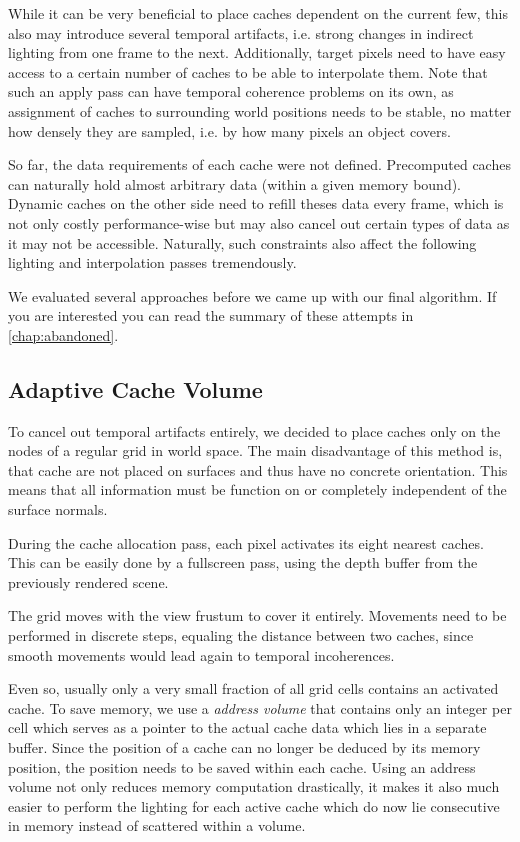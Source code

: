 \documentclass[thesis.tex]{subfiles}
\begin{document}
While it can be very beneficial to place caches dependent on the current few, this also may introduce several temporal artifacts, i.e. strong changes in indirect lighting from one frame to the next.
Additionally, target pixels need to have easy access to a certain number of caches to be able to interpolate them.
Note that such an apply pass can have temporal coherence problems on its own, as assignment of caches to surrounding world positions needs to be stable, no matter how densely they are sampled, i.e. by how many pixels an object covers.

So far, the data requirements of each cache were not defined.
Precomputed caches can naturally hold almost arbitrary data (within a given memory bound).
Dynamic caches on the other side need to refill theses data every frame, which is not only costly performance-wise but may also cancel out certain types of data as it may not be accessible. 
Naturally, such constraints also affect the following lighting and interpolation passes tremendously.

We evaluated several approaches before we came up with our final algorithm.
If you are interested you can read the summary of these attempts in \autoref{chap:abandoned}.

\subsection{Adaptive Cache Volume}
To cancel out temporal artifacts entirely, we decided to place caches only on the nodes of a regular grid in world space.
The main disadvantage of this method is, that cache are not placed on surfaces and thus have no concrete orientation.
This means that all information must be function on or completely independent of the surface normals.

During the cache allocation pass, each pixel activates its eight nearest caches.
This can be easily done by a fullscreen pass, using the depth buffer from the previously rendered scene.

The grid moves with the view frustum to cover it entirely.
Movements need to be performed in discrete steps, equaling the distance between two caches, since smooth movements would lead again to temporal incoherences.

Even so, usually only a very small fraction of all grid cells contains an activated cache.
To save memory, we use a \emph{address volume} that contains only an integer per cell which serves as a pointer to the actual cache data which lies in a separate buffer.
Since the position of a cache can no longer be deduced by its memory position, the position needs to be saved within each cache.
Using an address volume not only reduces memory computation drastically, it makes it also much easier to perform the lighting for each active cache which do now lie consecutive in memory instead of scattered within a volume.
\end{document}
